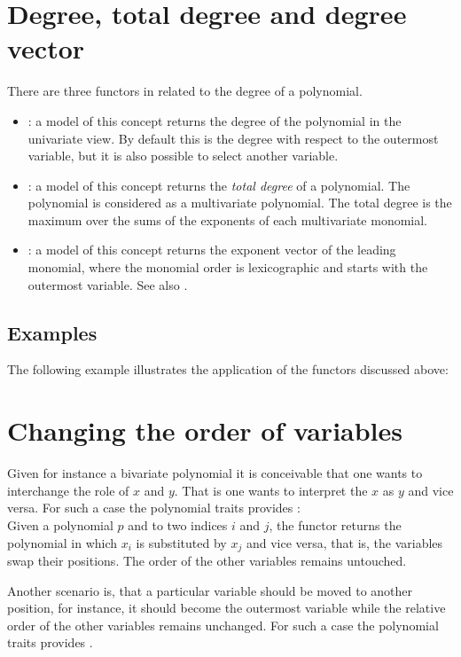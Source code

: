 \section{Degree, total degree and degree vector}

There are three functors in  
related to the degree of a polynomial. 
\begin{itemize}
\item {}: 
a model of this concept returns the degree of the polynomial in the univariate 
view. By default this is the degree with respect to the outermost variable, 
but it is also possible to select another variable. 
\item {}: 
a model of this concept returns the {\em total degree} of a polynomial. 
The polynomial is considered as a multivariate polynomial. 
The total degree is the maximum over the sums of the exponents of each 
multivariate monomial. 
\item {}:
a model of this concept returns the exponent vector of the leading monomial,
where the monomial order is lexicographic and starts with the outermost 
variable. See also  . 
\end{itemize}

\subsection{Examples}
The following example illustrates the application of the functors discussed 
above:

\section{Changing the order of variables}

Given for instance a bivariate polynomial it is conceivable that one wants to 
interchange the role of $x$ and $y$. That is one wants to interpret the 
$x$ as $y$ and vice versa.
For such a case the polynomial traits provides :\\
Given a polynomial $p$ and to two indices $i$ and $j$, 
the functor returns the polynomial in which $x_i$ is substituted by $x_j$ and 
vice versa, that is, the variables swap their positions.
The order of the other variables remains untouched. 

Another scenario is, that a particular variable should be moved to another 
position, for instance, it should become the outermost variable while the 
relative order of the other variables remains unchanged. 
For such a case the polynomial traits provides .

